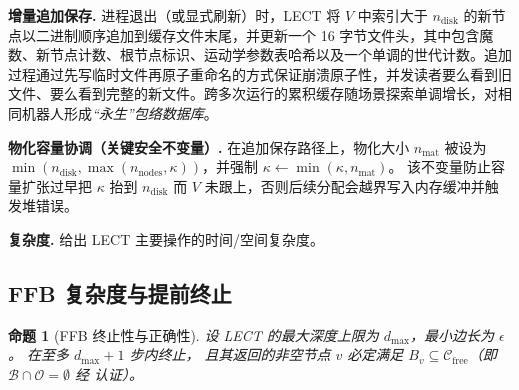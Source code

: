 \documentclass[journal]{IEEEtran}
\newtheorem{proposition}{命题}
\newcommand{\Cfree}{\mathcal{C}_{\mathrm{free}}}
\newcommand{\calO}{\mathcal{O}}
\begin{document}
\textbf{增量追加保存.}
进程退出（或显式刷新）时，LECT 将 $V$ 中索引大于 $n_\text{disk}$ 的新节点以二进制顺序追加到缓存文件末尾，并更新一个 16 字节文件头，其中包含魔数、新节点计数、根节点标识、运动学参数表哈希以及一个单调的世代计数。追加过程通过先写临时文件再原子重命名的方式保证崩溃原子性，并发读者要么看到旧文件、要么看到完整的新文件。跨多次运行的累积缓存随场景探索单调增长，对相同机器人形成\emph{“永生”包络数据库}。

\textbf{物化容量协调（关键安全不变量）.}
在追加保存路径上，物化大小 $n_\text{mat}$ 被设为 $\min(n_\text{disk},\max(n_\text{nodes},\kappa))$，并强制 $\kappa\leftarrow\min(\kappa,n_\text{mat})$。
该不变量防止容量扩张过早把 $\kappa$ 抬到 $n_\text{disk}$ 而 $V$ 未跟上，否则后续分配会越界写入内存缓冲并触发堆错误。

\textbf{复杂度.}
 给出 LECT 主要操作的时间/空间复杂度。

\begin{table}[ht]
\centering
\caption{LECT 操作复杂度（$D$~维、$N$~节点、$L_\text{act}$~活动连杆、$K$~平均 mmap 命中砖数）}
\label{tab:lect_complexity}
\end{table}

\subsection{FFB 复杂度与提前终止}\label{sec:ffb_analysis}

\begin{proposition}[FFB 终止性与正确性]\label{prop:ffb}
设 LECT 的最大深度上限为 $d_{\max}$，最小边长为 $\epsilon$。
 在至多 $d_{\max}+1$ 步内终止，
且其返回的非空节点 $v$ 必定满足
$B_v\subseteq\Cfree$（即 $\mathcal{B}\cap\calO=\emptyset$
经  认证）。
\end{proposition}
\end{document}

